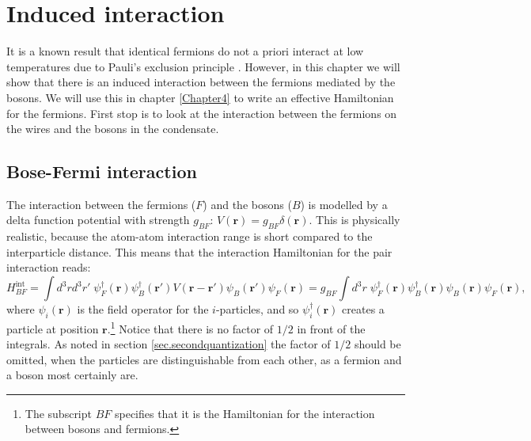 
\chapter{Induced interaction} %

\label{Chapter3} %


It is a known result that identical fermions do not a priori interact at low temperatures due to Pauli's exclusion principle \cite[p. 118]{Pethick}. However, in this chapter we will show that there is an induced interaction between the fermions mediated by the bosons. We will use this in chapter \ref{Chapter4} to write an effective Hamiltonian for the fermions. First stop is to look at the interaction between the fermions on the wires and the bosons in the condensate.

\section{Bose-Fermi interaction}
The interaction between the fermions ($F$) and the bosons ($B$) is modelled by a delta function potential with strength $g_{BF}$: $V(\mathbf{r})=g_{BF}\delta(\mathbf{r})$. This is physically realistic, because the atom-atom interaction range is short compared to the interparticle distance. This means that the interaction Hamiltonian for the pair interaction reads:
\begin{equation}
H_{BF}^\text{int}  = \int d^3 r d^3 r' \; \psi_F^\dagger(\mathbf{r}) \psi_B^\dagger(\mathbf{r}')V(\mathbf{r}-\mathbf{r}')\psi_B(\mathbf{r}')\psi_F(\mathbf{r}) = g_{BF}\int d^3 r \; \psi_F^\dagger(\mathbf{r}) \psi_B^\dagger(\mathbf{r})\psi_B(\mathbf{r})\psi_F(\mathbf{r}),
\label{eq.HintBF}
\end{equation}
where $\psi_i(\mathbf{r})$ is the field operator for the $i$-particles, and so $\psi_i^\dagger(\mathbf{r})$ creates a particle at position $\mathbf{r}$.\footnote{The subscript $BF$ specifies that it is the Hamiltonian for the interaction between bosons and fermions.} Notice that there is no factor of $1/2$ in front of the integrals. As noted in section \ref{sec.secondquantization} the factor of $1/2$ should be omitted, when the particles are distinguishable from each other, as a fermion and a boson most certainly are. 

